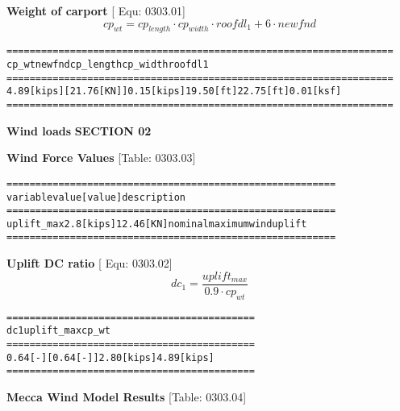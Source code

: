 \documentclass[12pt,notitle,letterpaper]{report}
\renewenvironment{quote}
  {\small\list{}{\rightmargin=0cm \leftmargin=0cm}%
   \item\relax}
  {\endlist}
\begin{document}
\textbf{Weight of carport} \hfill {[} Equ: 0303.01{]}
%
\begin{equation*}
cp_{wt} = cp_{length} \cdot cp_{width} \cdot roofdl_{1} + 6 \cdot newfnd
\end{equation*}
\begin{quote}
\begin{alltt}
=========================  ===========  ===========  ==========  ==========
          cp_wt              newfnd      cp_length    cp_width    roofdl1
=========================  ===========  ===========  ==========  ==========
4.89 [kips]  [21.76 [KN]]  0.15 [kips]  19.50 [ft]   22.75 [ft]  0.01 [ksf]
=========================  ===========  ===========  ==========  ==========
\end{alltt}
\end{quote}

\vspace{.2in}   \textbf{Wind loads}   \hfill\textbf{SECTION 02}
\newline   \vspace{.05in}   {\color{black}\hrulefill}

\textbf{Wind Force Values} \hfill  {[}Table: 0303.03{]}

\begin{quote}
\begin{alltt}
==========  ==========  ==========  ===========================
variable         value     [value]  description
==========  ==========  ==========  ===========================
uplift_max  2.8 [kips]  12.46 [KN]  nominal maximum wind uplift
==========  ==========  ==========  ===========================
\end{alltt}
\end{quote}

\textbf{Uplift DC ratio} \hfill {[} Equ: 0303.02{]}
%
\begin{equation*}
dc_{1} = \frac{uplift_{max}}{0.9 \cdot cp_{wt}}
\end{equation*}
\begin{quote}
\begin{alltt}
====================  ============  ===========
        dc1            uplift_max      cp_wt
====================  ============  ===========
0.64 [-]  [0.64 [-]]  2.80 [kips]   4.89 [kips]
====================  ============  ===========
\end{alltt}
\end{quote}

\textbf{Mecca Wind Model Results} \hfill  {[}Table: 0303.04{]}
\end{document}

